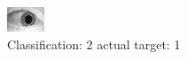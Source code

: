 \begin{figure}[h!]
\begin{center}
\includegraphics[width=0.60\columnwidth]{figures/ID1562_class_2_target_1.png}
\end{center}
\caption{ Classification: 2 actual target: 1}
\label{fig:ID1562_class_2_target_1}
\end{figure}
